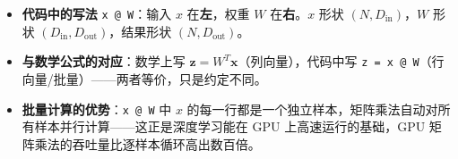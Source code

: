 \documentclass[a4paper,11pt]{ctexart}
\begin{document}
\begin{beginnerbox}
    \begin{itemize}
        \item \textbf{代码中的写法} \texttt{x @ W}：输入 $x$ 在\textbf{左}，权重 $W$ 在\textbf{右}。$x$ 形状 $(N, D_{\text{in}})$，$W$ 形状 $(D_{\text{in}}, D_{\text{out}})$，结果形状 $(N, D_{\text{out}})$。
        \item \textbf{与数学公式的对应}：数学上写 $\mathbf{z} = W^T\mathbf{x}$（列向量），代码中写 \texttt{z = x @ W}（行向量/批量）——两者等价，只是约定不同。
        \item \textbf{批量计算的优势}：\texttt{x @ W} 中 $x$ 的每一行都是一个独立样本，矩阵乘法自动对所有样本并行计算——这正是深度学习能在 GPU 上高速运行的基础，GPU 矩阵乘法的吞吐量比逐样本循环高出数百倍。
    \end{itemize}
\end{beginnerbox}
\end{document}
